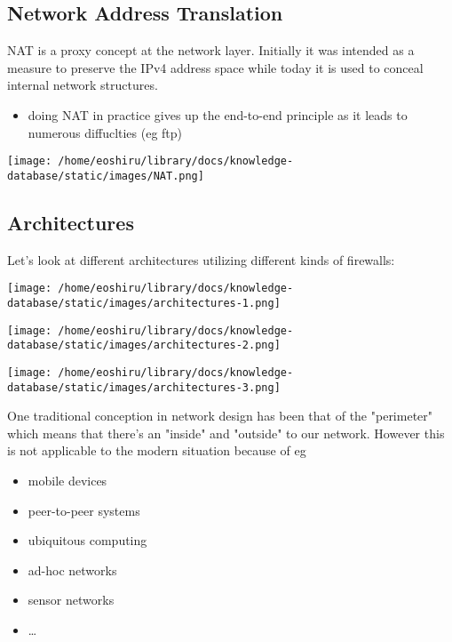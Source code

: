 \documentclass[11pt]{article}
\begin{document}
\subsection{Network Address Translation}
\label{sec:org1a3fed5}
NAT is a proxy concept at the network layer. Initially it was intended as a measure to preserve the IPv4 address space while today it is used to conceal internal network structures.
\begin{itemize}
\item doing NAT in practice gives up the end-to-end principle as it leads to numerous diffuclties (eg ftp)
\end{itemize}

\begin{center}
\texttt{[image: /home/eoshiru/library/docs/knowledge-database/static/images/NAT.png]}
\end{center}

\subsection{Architectures}
\label{sec:org646f30e}
Let's look at different architectures utilizing different kinds of firewalls:\\
\begin{center}
\texttt{[image: /home/eoshiru/library/docs/knowledge-database/static/images/architectures-1.png]}
\end{center}
\begin{center}
\texttt{[image: /home/eoshiru/library/docs/knowledge-database/static/images/architectures-2.png]}
\end{center}
\begin{center}
\texttt{[image: /home/eoshiru/library/docs/knowledge-database/static/images/architectures-3.png]}
\end{center}

One traditional conception in network design has been that of the "perimeter" which means that there's an "inside" and "outside" to our network. However this is not applicable to the modern situation because of eg
\begin{itemize}
\item mobile devices
\item peer-to-peer systems
\item ubiquitous computing
\item ad-hoc networks
\item sensor networks
\item \ldots{}
\end{itemize}
\end{document}
